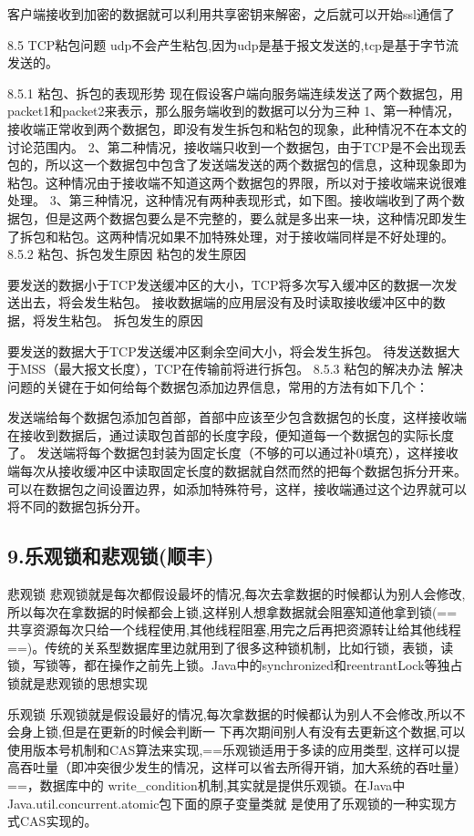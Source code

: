 \documentclass[UTF8]{ctexart}
\begin{document}
客户端接收到加密的数据就可以利用共享密钥来解密，之后就可以开始ssl通信了

8.5 TCP粘包问题
udp不会产生粘包,因为udp是基于报文发送的,tcp是基于字节流发送的。

8.5.1 粘包、拆包的表现形势
现在假设客户端向服务端连续发送了两个数据包，用packet1和packet2来表示，那么服务端收到的数据可以分为三种
1、第一种情况，接收端正常收到两个数据包，即没有发生拆包和粘包的现象，此种情况不在本文的讨论范围内。
2、第二种情况，接收端只收到一个数据包，由于TCP是不会出现丢包的，所以这一个数据包中包含了发送端发送的两个数据包的信息，这种现象即为粘包。这种情况由于接收端不知道这两个数据包的界限，所以对于接收端来说很难处理。
3、第三种情况，这种情况有两种表现形式，如下图。接收端收到了两个数据包，但是这两个数据包要么是不完整的，要么就是多出来一块，这种情况即发生了拆包和粘包。这两种情况如果不加特殊处理，对于接收端同样是不好处理的。
8.5.2 粘包、拆包发生原因
粘包的发生原因

要发送的数据小于TCP发送缓冲区的大小，TCP将多次写入缓冲区的数据一次发送出去，将会发生粘包。
接收数据端的应用层没有及时读取接收缓冲区中的数据，将发生粘包。
拆包发生的原因

要发送的数据大于TCP发送缓冲区剩余空间大小，将会发生拆包。
待发送数据大于MSS（最大报文长度），TCP在传输前将进行拆包。
8.5.3 粘包的解决办法
解决问题的关键在于如何给每个数据包添加边界信息，常用的方法有如下几个：

发送端给每个数据包添加包首部，首部中应该至少包含数据包的长度，这样接收端在接收到数据后，通过读取包首部的长度字段，便知道每一个数据包的实际长度了。
发送端将每个数据包封装为固定长度（不够的可以通过补0填充），这样接收端每次从接收缓冲区中读取固定长度的数据就自然而然的把每个数据包拆分开来。
可以在数据包之间设置边界，如添加特殊符号，这样，接收端通过这个边界就可以将不同的数据包拆分开。

\subsection{9.乐观锁和悲观锁(顺丰)}

悲观锁
悲观锁就是每次都假设最坏的情况,每次去拿数据的时候都认为别人会修改,所以每次在拿数据的时候都会上锁,这样别人想拿数据就会阻塞知道他拿到锁(==共享资源每次只给一个线程使用,其他线程阻塞,用完之后再把资源转让给其他线程==)。传统的关系型数据库里边就用到了很多这种锁机制，比如行锁，表锁，读锁，写锁等，都在操作之前先上锁。Java中的synchronized和reentrantLock等独占锁就是悲观锁的思想实现

乐观锁
乐观锁就是假设最好的情况,每次拿数据的时候都认为别人不会修改,所以不会身上锁,但是在更新的时候会判断一
下再次期间别人有没有去更新这个数据,可以使用版本号机制和CAS算法来实现,==乐观锁适用于多读的应用类型,
这样可以提高吞吐量（即冲突很少发生的情况，这样可以省去所得开销，加大系统的吞吐量）==，数据库中的
write\_condition机制,其实就是提供乐观锁。在Java中Java.util.concurrent.atomic包下面的原子变量类就
是使用了乐观锁的一种实现方式CAS实现的。
\end{document}
